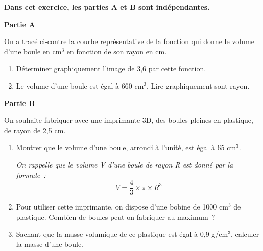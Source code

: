 \documentclass[exercice]{thedocument}%
\begin{document}
%
    \textbf{Dans cet exercice, les parties A et B sont
    indépendantes.}\par\noindent
    \begin{minipage}{.5\linewidth}
        \noindent\textbf{Partie A}\medskip\par\noindent
        On a tracé ci-contre la courbe représentative de la fonction
        qui donne le volume d'une boule en cm$^3$ en fonction de
        son rayon en cm.
        \begin{enumerate}
            \item Déterminer graphiquement l'image de 3,6 par cette
            fonction.
            \item Le volume d'une boule est égal à 660 cm$^3$. Lire
            graphiquement sont rayon.
        \end{enumerate}
    \end{minipage}
    \begin{minipage}[c]{.45\linewidth}
    \end{minipage}\medskip\par\noindent
    \textbf{Partie B}\medskip\par\noindent
    On souhaite fabriquer avec une imprimante 3D, des boules
    pleines en plastique, de rayon de 2,5 cm.
    \begin{enumerate}
        \item Montrer que le volume d'une boule, arrondi à l'unité,
        est égal à 65 cm$^3$.\par\smallskip\noindent
        \textit{On rappelle que le volume V d'une boule de rayon R
        est donné par la formule~:}$$V=\dfrac43\times\pi\times R^3$$
        \item Pour utiliser cette imprimante, on dispose d'une bobine
        de \num{1000} cm$^3$ de plastique. Combien de boules peut-on
        fabriquer au maximum~?
        \item Sachant que la masse volumique de ce plastique est égal
        à 0,9 g/cm$^3$, calculer la masse d'une boule.
    \end{enumerate}
    \showthesource
\end{document}
